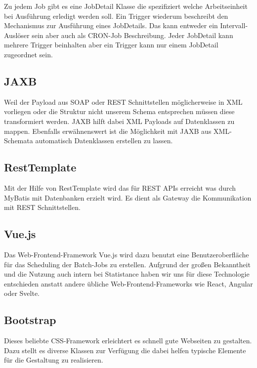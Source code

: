 Zu jedem Job gibt es eine JobDetail Klasse die spezifiziert welche Arbeitseinheit bei Ausführung erledigt werden soll. Ein Trigger wiederum beschreibt den Mechanismus zur Ausführung eines JobDetails. Das kann entweder ein Intervall-Auslöser sein aber auch als CRON-Job Beschreibung.
Jeder JobDetail kann mehrere Trigger beinhalten aber ein Trigger kann nur einem JobDetail zugeordnet sein.

\subsection*{JAXB}
Weil der Payload aus SOAP oder REST Schnittstellen möglicherweise in XML vorliegen oder die Struktur nicht unserem Schema entsprechen müssen diese transformiert werden. JAXB hilft dabei XML Payloads auf Datenklassen zu mappen. Ebenfalls erwähnenswert ist die Möglichkeit mit JAXB aus XML-Schemata automatisch Datenklassen erstellen zu lassen.

\subsection*{RestTemplate}
 Mit der Hilfe von RestTemplate wird das für REST APIs erreicht was durch MyBatis mit Datenbanken erzielt wird. Es dient als Gateway die Kommunikation mit REST Schnittstellen.

\subsection*{Vue.js}
Das Web-Frontend-Framework Vue.js wird dazu benutzt eine Benutzeroberfläche für das Scheduling der Batch-Jobs zu erstellen. Aufgrund der großen Bekanntheit und die Nutzung auch intern bei Statistance haben wir uns für diese Technologie entschieden anstatt andere übliche Web-Frontend-Frameworks wie React, Angular oder Svelte.

\subsection*{Bootstrap}
Dieses beliebte CSS-Framework erleichtert es schnell gute Webseiten zu gestalten. Dazu stellt es diverse Klassen zur Verfügung die dabei helfen typische Elemente für die Gestaltung zu realisieren.
